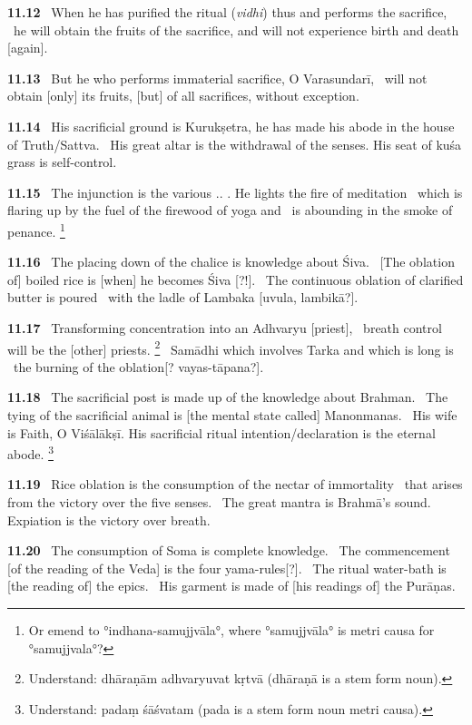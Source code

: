 \documentclass{article}
\newcommand{\skt}[1]{\textit{#1}}
\begin{document}
\textbf{11.12}%
\ When he has purified the ritual (\skt{vidhi}) thus and performs the sacrifice,%
\ he will obtain the fruits of the sacrifice, and will not experience birth and death [again].%


\textbf{11.13}%
\ But he who performs immaterial sacrifice, O Varasundarī,%
\ will not obtain [only] its fruits, [but] of all sacrifices, without exception.%


\textbf{11.14}%
\ His sacrificial ground is Kurukṣetra, he has made his abode in the house of Truth/Sattva.%
\ His great altar is the withdrawal of the senses. His seat of kuśa grass is self-control.%


\textbf{11.15}%
\ The injunction is the various .. . He lights the fire of meditation%
\ which is flaring up by the fuel of the firewood of yoga and%
\              is abounding in the smoke of penance.%
\footnote{Or emend to °indhana-samujjvāla°, where °samujjvāla° is metri causa for °samujjvala°? }%


\textbf{11.16}%
\ The placing down of the chalice is knowledge about Śiva.%
\                                 [The oblation of] boiled rice is [when] he becomes Śiva [?!].%
\ The continuous oblation of clarified butter is poured%
\                                 with the ladle of Lambaka [uvula, lambikā?].%


\textbf{11.17}%
\ Transforming concentration into an Adhvaryu [priest],%
\              breath control will be the [other] priests.%
\footnote{Understand: dhāraṇām adhvaryuvat kṛtvā (dhāraṇā is a stem form noun). }%
\ Samādhi which involves Tarka and which is long is%
\                  the burning of the oblation[? vayas-tāpana?].%


\textbf{11.18}%
\ The sacrificial post is made up of the knowledge about Brahman.%
\              The tying of the sacrificial animal is [the mental state called] Manonmanas.%
\ His wife is Faith, O Viśālākṣī. His sacrificial ritual intention/declaration is the eternal abode.%
\footnote{Understand: padaṃ śāśvatam (pada is a stem form noun metri causa). }%


\textbf{11.19}%
\ Rice oblation is the consumption of the nectar of immortality%
\                      that arises from the victory over the five senses.%
\ The great mantra is Brahmā's sound. Expiation is the victory over breath.%


\textbf{11.20}%
\ The consumption of Soma is complete knowledge.%
\              The commencement [of the reading of the Veda] is the four yama-rules[?].%
\ The ritual water-bath is [the reading of] the epics.%
\              His garment is made of [his readings of] the Purāṇas.%
\end{document}
